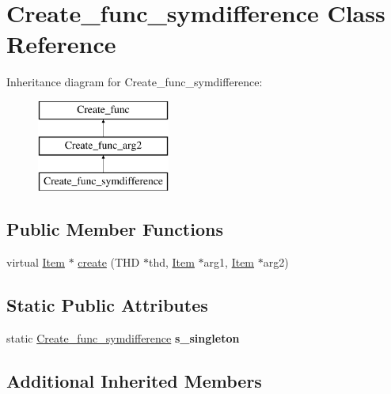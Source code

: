 \hypertarget{classCreate__func__symdifference}{}\section{Create\+\_\+func\+\_\+symdifference Class Reference}
\label{classCreate__func__symdifference}
Inheritance diagram for Create\+\_\+func\+\_\+symdifference\+:\begin{figure}[H]
\begin{center}
\leavevmode
\includegraphics[height=3.000000cm]{classCreate__func__symdifference}
\end{center}
\end{figure}
\subsection*{Public Member Functions}
\begin{DoxyCompactItemize}
\item 
virtual \mbox{\hyperlink{classItem}{Item}} $\ast$ \mbox{\hyperlink{classCreate__func__symdifference_a08bd58786d7668de38c49da20473e7b9}{create}} (T\+HD $\ast$thd, \mbox{\hyperlink{classItem}{Item}} $\ast$arg1, \mbox{\hyperlink{classItem}{Item}} $\ast$arg2)
\end{DoxyCompactItemize}
\subsection*{Static Public Attributes}
\begin{DoxyCompactItemize}
\item 
\mbox{\label{classCreate__func__symdifference_a67213159440db20879f5524c0331cc66}} 
static \mbox{\hyperlink{classCreate__func__symdifference}{Create\+\_\+func\+\_\+symdifference}} {\bfseries s\+\_\+singleton}
\end{DoxyCompactItemize}
\subsection*{Additional Inherited Members}


